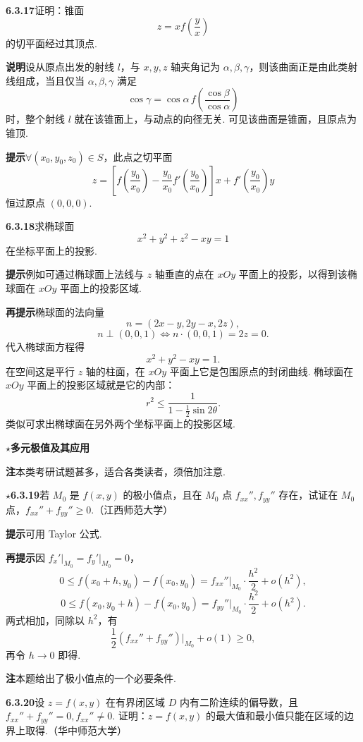 \documentclass[UTF8,12pt,a4paper,fontset=fandol]{ctexart}
\begin{document}
\noindent\textbf{6.3.17}\quad 证明：锥面
\[
  z=xf\left(\frac{y}{x}\right)
\]
的切平面经过其顶点.

\noindent\textbf{说明}\quad 设从原点出发的射线 $l$，与 $x,y,z$ 轴夹角记为 $\alpha,\beta,\gamma$，则该曲面正是由此类射线组成，当且仅当 $\alpha,\beta,\gamma$ 满足
\[
  \cos\gamma=\cos\alpha\,f\left(\frac{\cos\beta}{\cos\alpha}\right)
\]
时，整个射线 $l$ 就在该锥面上，与动点的向径无关. 可见该曲面是锥面，且原点为锥顶.

\noindent\textbf{提示}\quad $\forall(x_0,y_0,z_0)\in S$，此点之切平面
\[
  z=\left[f\left(\frac{y_0}{x_0}\right)
  -\frac{y_0}{x_0}f'\left(\frac{y_0}{x_0}\right)\right]x
  +f'\left(\frac{y_0}{x_0}\right)y
\]
恒过原点 $(0,0,0)$.

\noindent\textbf{6.3.18}\quad 求椭球面
\[
  x^2+y^2+z^2-xy=1
\]
在坐标平面上的投影.

\noindent\textbf{提示}\quad 例如可通过椭球面上法线与 $z$ 轴垂直的点在 $xOy$ 平面上的投影，以得到该椭球面在 $xOy$ 平面上的投影区域.

\noindent\textbf{再提示}\quad 椭球面的法向量
\[
  n=(2x-y,2y-x,2z),
\]
\[
  n\perp(0,0,1)\Leftrightarrow n\cdot(0,0,1)=2z=0.
\]
代入椭球面方程得
\[
  x^2+y^2-xy=1.
\]
在空间这是平行 $z$ 轴的柱面，在 $xOy$ 平面上它是包围原点的封闭曲线. 椭球面在 $xOy$ 平面上的投影区域就是它的内部：
\[
  r^2\le\frac1{1-\frac12\sin2\theta}.
\]
类似可求出椭球面在另外两个坐标平面上的投影区域.

\noindent\textbf{\ensuremath{\star}多元极值及其应用}

\noindent\textbf{注}\quad 本类考研试题甚多，适合各类读者，须倍加注意.

\noindent\textbf{\ensuremath{\star}6.3.19}\quad 若 $M_0$ 是 $f(x,y)$ 的极小值点，且在 $M_0$ 点 $f_{xx}'',f_{yy}''$ 存在，试证在 $M_0$ 点，$f_{xx}''+f_{yy}''\ge0$.（江西师范大学）

\noindent\textbf{提示}\quad 可用 Taylor 公式.

\noindent\textbf{再提示}\quad 因 $f_x'\big|_{M_0}=f_y'\big|_{M_0}=0$，
\[
  0\le f(x_0+h,y_0)-f(x_0,y_0)
  =f_{xx}''\big|_{M_0}\cdot\frac{h^2}{2}+o(h^2),
\]
\[
  0\le f(x_0,y_0+h)-f(x_0,y_0)
  =f_{yy}''\big|_{M_0}\cdot\frac{h^2}{2}+o(h^2).
\]
两式相加，同除以 $h^2$，有
\[
  \frac12(f_{xx}''+f_{yy}'')\big|_{M_0}+o(1)\ge0,
\]
再令 $h\to0$ 即得.

\noindent\textbf{注}\quad 本题给出了极小值点的一个必要条件.

\noindent\textbf{6.3.20}\quad 设 $z=f(x,y)$ 在有界闭区域 $D$ 内有二阶连续的偏导数，且 $f_{xx}''+f_{yy}''=0,f_{xx}''\ne0$. 证明：$z=f(x,y)$ 的最大值和最小值只能在区域的边界上取得.（华中师范大学）
\end{document}
